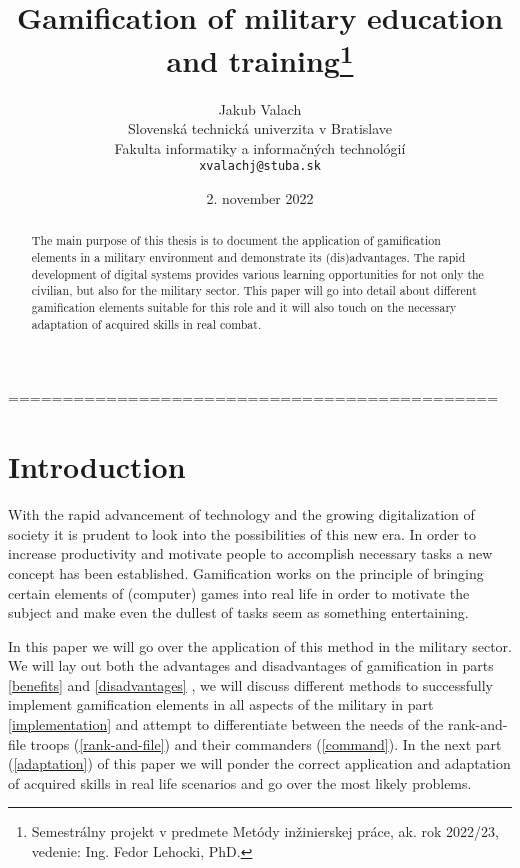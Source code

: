\documentclass[10pt,twoside,slovak,a4paper]{article}
\title{Gamification of military education and training\thanks{Semestrálny projekt v predmete Metódy inžinierskej práce, ak. rok 2022/23, vedenie: Ing. Fedor Lehocki, PhD.}} %
\author{Jakub Valach\\[2pt]
	{\small Slovenská technická univerzita v Bratislave}\\
	{\small Fakulta informatiky a informačných technológií}\\
	{\small \texttt{xvalachj@stuba.sk}}
	}
\date{\small 2. november 2022}
\begin{document}
\maketitle

\begin{abstract}
The main purpose of this thesis is to document the application of gamification elements in a military environment and demonstrate its (dis)advantages. The rapid development of digital systems provides various learning opportunities for not only the civilian, but also for the military sector. This paper will go into detail about different gamification elements suitable for this role and it will also touch on the necessary adaptation of acquired skills in real combat.
\end{abstract}



=============================================
\section{Introduction}

With the rapid advancement of technology and the growing digitalization of society it is prudent to look into the possibilities of this new era. In order to increase productivity and motivate people to accomplish necessary tasks a new concept has been established. Gamification works on the principle of bringing certain elements of (computer) games into real life in order to motivate the subject and make even the dullest of tasks seem as something entertaining. 
\par In this paper we will go over the application of this method in the military sector. We will lay out both the advantages and disadvantages of gamification in parts \ref{benefits} and \ref{disadvantages} , we will discuss different methods to successfully implement gamification elements in all aspects of the military in part \ref{implementation} and attempt to differentiate between the needs of the rank-and-file troops (\ref{rank-and-file}) and their commanders (\ref{command}). In the next part (\ref{adaptation}) of this paper we will ponder the correct application and adaptation of acquired skills in real life scenarios and go over the most likely problems.
\newpage

\end{document}
